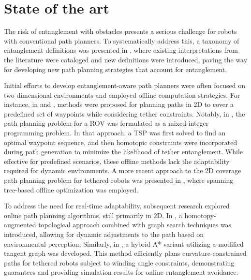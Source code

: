 \section{State of the art}
\label{sec:related_work}

The risk of entanglement with obstacles presents a serious challenge for robots with conventional path planners. To systematically address this, a taxonomy of entanglement definitions was presented in \cite{definitions}, where existing interpretations from the literature were cataloged and new definitions were introduced, paving the way for developing new path planning strategies that account for entanglement.

Initial efforts to develop entanglement-aware path planners were often focused on two-dimensional environments and employed offline computation strategies. For instance, in \cite{rov_mccammon} and \cite{mechsy2017novel}, methods were proposed for planning paths in 2D to cover a predefined set of waypoints while considering tether constraints. Notably, in \cite{mechsy2017novel}, the path planning problem for a \ac{ROV} was formulated as a mixed-integer programming problem. In that approach, a \ac{TSP} was first solved to find an optimal waypoint sequence, and then homotopic constraints were incorporated during path generation to minimize the likelihood of tether entanglement. While effective for predefined scenarios, these offline methods lack the adaptability required for dynamic environments. A more recent approach to the 2D coverage path planning problem for tethered robots was presented in \cite{peng2025spanning}, where spanning tree-based offline optimization was employed.

To address the need for real-time adaptability, subsequent research explored online path planning algorithms, still primarily in 2D. In \cite{kim}, a homotopy-augmented topological approach combined with graph search techniques was introduced, allowing for dynamic adjustments to the path based on environmental perception. Similarly, in \cite{withy}, a hybrid A* variant utilizing a modified tangent graph was developed. This method efficiently plans curvature-constrained paths for tethered robots subject to winding angle constraints, demonstrating guarantees and providing simulation results for online entanglement avoidance.

